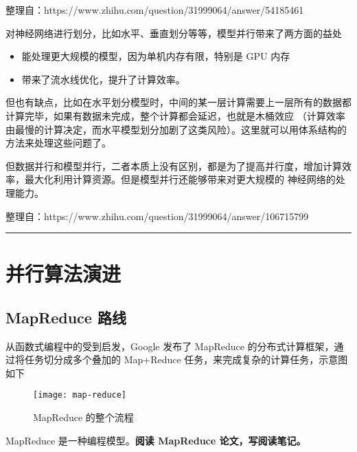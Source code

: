 整理自：https://www.zhihu.com/question/31999064/answer/54185461

\begin{newnote}[模型并行带来的两方面益处]
对神经网络进行划分，比如水平、垂直划分等等，模型并行带来了两方面的益处
\begin{itemize}
  \item 能处理更大规模的模型，因为单机内存有限，特别是 GPU 内存
  \item 带来了流水线优化，提升了计算效率。
\end{itemize}
但也有缺点，比如在水平划分模型时，中间的某一层计算需要上一层所有的数据都计算完毕，如果有数据未完成，整个计算都会延迟，也就是木桶效应
（计算效率由最慢的计算决定，而水平模型划分加剧了这类风险）。这里就可以用体系结构的方法来处理这些问题了。

但数据并行和模型并行，二者本质上没有区别，都是为了提高并行度，增加计算效率，最大化利用计算资源。但是模型并行还能够带来对更大规模的
神经网络的处理能力。

整理自：https://www.zhihu.com/question/31999064/answer/106715799
\end{newnote}

\begin{newnote}[GPU 内存]

\end{newnote}

\noindent\rule[0.25\baselineskip]{\textwidth}{1pt} %


\section{并行算法演进}\label{sec:para-algorithms}

\subsection{MapReduce 路线}\label{subsec:mapreduce}

从函数式编程中的受到启发，Google 发布了 MapReduce 的分布式计算框架，通过将任务切分成多个叠加的 Map+Reduce 任务，来完成复杂的计算任务，示意图如下

\begin{figure}[!hbtp]
\centering
\texttt{[image: map-reduce]}
\caption{MapReduce 的整个流程}
\end{figure}

\begin{newnote}[MapReduce]
MapReduce 是一种编程模型。\textbf{阅读 MapReduce 论文，写阅读笔记。}  %
\end{newnote}

